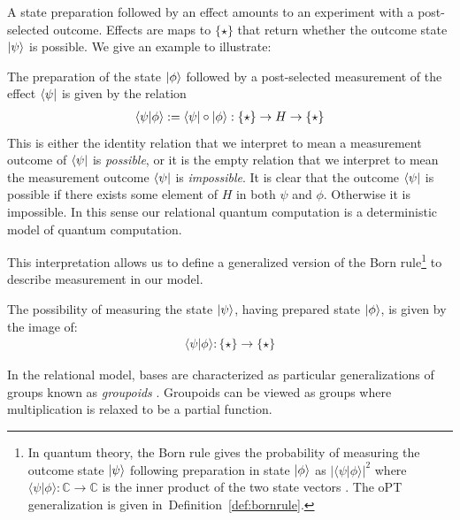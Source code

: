 \noindent A state preparation followed by an effect amounts to an experiment with a post-selected outcome. Effects are maps to $\{\star\}$ that return whether the outcome state $| \psi \rangle$ is possible.
 We give an example to illustrate:
\begin{example}
The preparation of the state $| \phi \rangle$ followed by a post-selected measurement of the effect $\langle \psi |$ is given by the relation
\begin{align*}
\langle\psi|\phi\rangle:=\langle \psi |\circ| \phi \rangle:\{\star\}\to H\to \{\star\}
\end{align*}
This is either the identity relation that we interpret to mean a measurement outcome of $\langle \psi |$ is \emph{possible}, or it is the empty relation that we interpret to mean the measurement outcome $\langle \psi |$ is \emph{impossible}. It is clear that the outcome $\langle \psi |$ is possible if there exists some element of $H$ in both $\psi$ and $\phi$. Otherwise it is impossible.
In this sense our relational quantum computation is a deterministic model of quantum computation.
\end{example}

This interpretation allows us to define a generalized version of the Born rule\footnote{In quantum theory, the Born rule gives the probability of measuring the outcome state $| \psi \rangle$ following preparation in state $| \phi \rangle$ as $|\langle\psi|\phi\rangle|^2$ where $\langle\psi|\phi\rangle:\mathbb{C}\to\mathbb{C}$ is the inner product of the two state vectors \cite{nielsen2010quantum}. The oPT generalization is given in\ Definition~\ref{def:bornrule}.} to describe measurement in our model.
\begin{axiom}
\label{ax:relborn}
The possibility of measuring the state $| \psi \rangle$, having prepared state $| \phi \rangle$, is given by the image of:
\begin{align}
\langle\psi|\phi\rangle:\{\star\}\to\{\star\}
\end{align}
\end{axiom}

In the relational model, bases are characterized as particular generalizations of groups known as \textit{groupoids} \cite{cqm-notes,pavlovic2009quantum}.  Groupoids can be viewed as groups where multiplication is relaxed to be a partial function.

